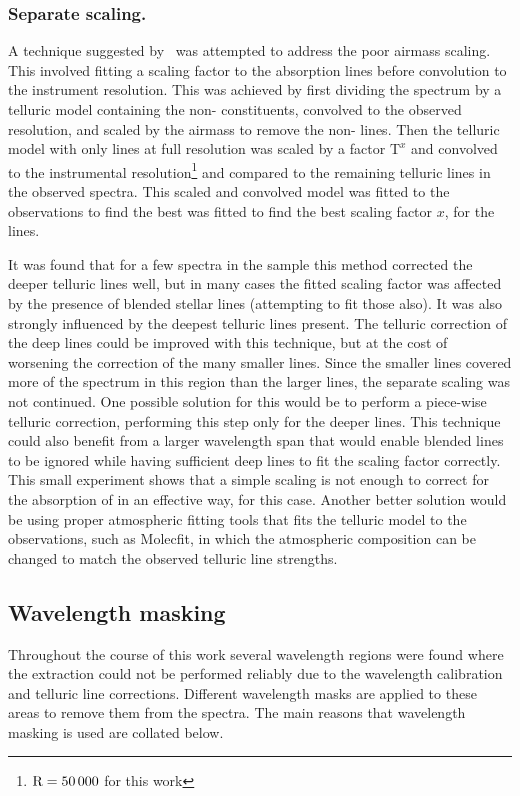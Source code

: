 \subsubsection{Separate  scaling.}
A technique suggested by~\citet{bertaux_tapas_2014} was attempted to address the poor  airmass scaling.
This involved fitting a scaling factor to the  absorption lines before convolution to the instrument resolution.
This was achieved by first dividing the spectrum by a telluric model containing the non- constituents, convolved to the observed resolution, and scaled by the airmass to remove the non- lines.
Then the telluric model with only  lines at full resolution was scaled by a factor \(\textrm{T}^{x}\) and convolved to the instrumental resolution\footnote{\(\rm R=50\,000\) for this work} and compared to the remaining telluric lines in the observed spectra.
This scaled and convolved model was fitted to the observations to find the best was fitted to find the best scaling factor \(x\), for the  lines.

It was found that for a few spectra in the sample this method corrected the deeper telluric lines well, but in many cases the fitted scaling factor was affected by the presence of blended stellar lines (attempting to fit those also).
It was also strongly influenced by the deepest  telluric lines present.
The telluric correction of the deep  lines could be improved with this technique, but at the cost of worsening the correction of the many smaller  lines.
Since the smaller  lines covered more of the spectrum in this region than the larger lines, the separate  scaling was not continued.
One possible solution for this would be to perform a piece-wise telluric correction, performing this step only for the deeper  lines.
This technique could also benefit from a larger wavelength span that would enable blended lines to be ignored while having sufficient deep  lines to fit the scaling factor correctly.
This small experiment shows that a simple scaling is not enough to correct for the absorption of  in an effective way, for this case.
Another better solution would be using proper atmospheric fitting tools that fits the telluric model to the observations, such as {Molecfit}, in which the atmospheric composition can be changed to match the observed telluric line strengths.


\subsection{Wavelength masking}
Throughout the course of this work several wavelength regions were found where the extraction could not be performed reliably due to the wavelength calibration and telluric line corrections.
Different wavelength masks are applied to these areas to remove them from the spectra.
The main reasons that wavelength masking is used are collated below.

